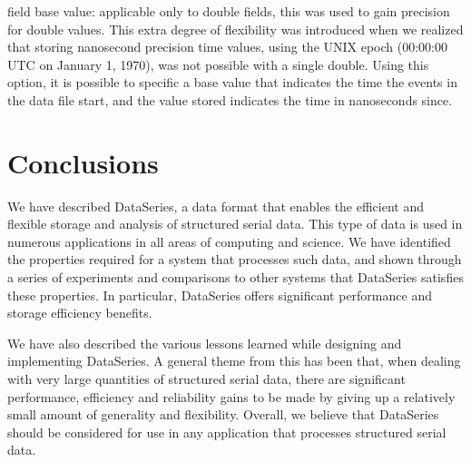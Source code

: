 \documentclass{acm_proc_article-sp}
\begin{document}
field base value: applicable only to double fields,
this was used to gain precision for double values. This extra degree
of flexibility was introduced when we realized that storing nanosecond
precision time values, using the UNIX epoch (00:00:00 UTC on January
1, 1970), was not possible with a single double. Using this option, it
is possible to specific a base value that indicates the time the
events in the data file start, and the value stored indicates the time
in nanoseconds since.

\fi


\section{Conclusions}\label{sec:conclusions}

We have described DataSeries, a data format that enables the efficient
and flexible storage and analysis
of structured serial data. This type of data is
used in numerous applications in all areas of computing and
science. We have identified the properties required for a system that
processes such data, and shown through a series of experiments and
comparisons to other systems that DataSeries satisfies these
properties. In particular, DataSeries offers significant performance
and storage efficiency benefits.  

We have also described the various lessons learned while designing and
implementing DataSeries. A general theme from this has been that, when
dealing with very large quantities of structured serial data, 
there are significant performance, efficiency and reliability gains to be made
by giving up a relatively small amount of generality and flexibility. 
%
Overall, we believe that DataSeries should be considered for use in
any application that processes structured serial data. 


{\small

}
%
%
\balancecolumns
\end{document}

